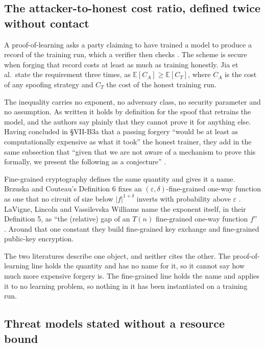 \subsection{The attacker-to-honest cost ratio, defined twice without contact}
\label{sec:problem-two}

A proof-of-learning asks a party claiming to have trained a model to produce a
record of the training run, which a verifier then checks \cite{JYCDTCP21}. The
scheme is secure when forging that record costs at least as much as training
honestly. Jia et al.\ state the requirement three times, as $\mathbb{E}[C_A]
\geq \mathbb{E}[C_T]$, where $C_A$ is the cost of any spoofing strategy and
$C_T$ the cost of the honest training run.

The inequality carries no exponent, no adversary class, no security parameter
and no assumption. As written it holds by definition for the spoof that
retrains the model, and the authors say plainly that they cannot prove it for
anything else. Having concluded in \S VII-B3a that a passing forgery ``would
be at least as computationally expensive as what it took'' the honest trainer,
they add in the same subsection that ``given that we are not aware of a
mechanism to prove this formally, we present the following as a conjecture''
\cite{JYCDTCP21}.

Fine-grained cryptography defines the same quantity and gives it a name.
Brzuska and Couteau's Definition 6 fixes an
$(\varepsilon,\delta)$-fine-grained one-way function as one that no circuit of
size below $|f|^{1+\delta}$ inverts with probability above $\varepsilon$
\cite{BC22}. LaVigne, Lincoln and Vassilevska Williams name the exponent
itself, in their Definition 5, as ``the (relative) gap of an $T(n)$
fine-grained one-way function $f$'' \cite{LLW19}. Around that one constant
they build fine-grained key exchange and fine-grained public-key encryption.

The two literatures describe one object, and neither cites the other. The
proof-of-learning line holds the quantity and has no name for it, so it cannot
say how much more expensive forgery is. The fine-grained line holds the name
and applies it to no learning problem, so nothing in it has been instantiated
on a training run.

\subsection{Threat models stated without a resource bound}
\label{sec:problem-three}

